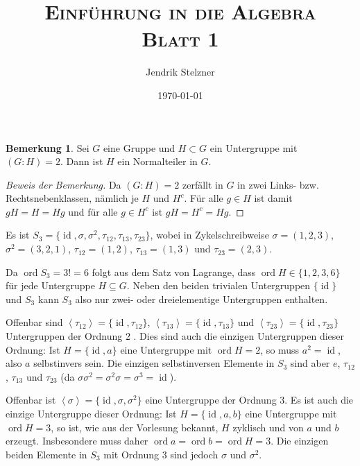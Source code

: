 \documentclass[a4paper,10pt]{article}
\title{\textsc{Einführung in die Algebra \\ \Large Blatt 1}}
\author{Jendrik Stelzner}
\date{\today}
\theoremstyle{definition}
\newtheorem*{bem}{Bemerkung}
\newcommand{\id}{\operatorname{id}}
\newcommand{\ord}{\operatorname{ord}}
\newcommand{\gen}[1]{\left\langle#1\right\rangle}
\begin{document}
\maketitle





\section{}

\begin{bem}
 Sei $G$ eine Gruppe und $H \subset G$ ein Untergruppe mit $(G : H) = 2$. Dann ist $H$ ein Normalteiler in $G$.
\end{bem}
\begin{proof}[Beweis der Bemerkung]
 Da $(G : H) = 2$ zerfällt in $G$ in zwei Links- bzw. Rechtsnebenklassen, nämlich je $H$ und $H^c$. Für alle $g \in H$ ist damit $gH = H = Hg$ und für alle $g \in H^c$ ist $gH = H^c = Hg$.
\end{proof}

Es ist $S_3 = \{\id, \sigma, \sigma^2, \tau_{12}, \tau_{13}, \tau_{23} \}$, wobei in Zykelschreibweise $\sigma = (1,2,3)$, $\sigma^2 = (3,2,1)$, $\tau_{12} = (1,2)$, $\tau_{13} = (1,3)$ und $\tau_{23} = (2,3)$.

Da $\ord S_3 = 3! = 6$ folgt aus dem Satz von Lagrange, dass $\ord H \in \{1,2,3,6\}$ für jede Untergruppe $H \subseteq G$. Neben den beiden trivialen Untergruppen $\{\id\}$ und $S_3$ kann $S_3$ also nur zwei- oder dreielementige Untergruppen enthalten.

Offenbar sind $\gen{\tau_{12}} = \{\id,\tau_{12}\}$, $\gen{\tau_{13}} = \{\id, \tau_{13}\}$ und $\gen{\tau_{23}} = \{\id, \tau_{23}\}$ Untergruppen der Ordnung $2$ . Dies sind auch die einzigen Untergruppen dieser Ordnung: Ist $H = \{\id, a\}$ eine Untergruppe mit $\ord H = 2$, so muss $a^2 = \id$, also $a$ selbstinvers sein. Die einzigen selbstinversen Elemente in $S_3$ sind aber $e$, $\tau_{12}$, $\tau_{13}$ und $\tau_{23}$ (da $\sigma \sigma^2 = \sigma^2 \sigma = \sigma^3 = \id$).

Offenbar ist $\gen{\sigma} = \{\id, \sigma, \sigma^2\}$ eine Untergruppe der Ordnung $3$. Es ist auch die einzige Untergruppe dieser Ordnung: Ist $H = \{\id, a, b\}$ eine Untergruppe mit $\ord H = 3$, so ist, wie aus der Vorlesung bekannt, $H$ zyklisch und von $a$ und $b$ erzeugt. Insbesondere muss daher $\ord a = \ord b = \ord H = 3$. Die einzigen beiden Elemente in $S_3$ mit Ordnung $3$ sind jedoch $\sigma$ und $\sigma^2$.
\end{document}
